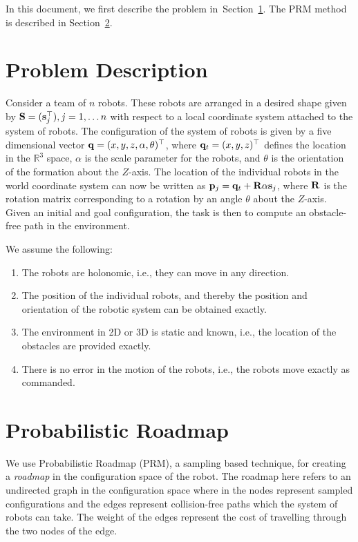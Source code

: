 \documentclass[12pt,a4paper, onecolumn]{IEEEtran}
\newcommand{\vsj}{\mv s_j}
\begin{document}
In this document, we first describe the problem in~Section~\ref{sc:problem}. The PRM
method is described in Section~\ref{sc:prm}. 
\section{Problem Description}

\label{sc:problem}
Consider a team of $n$ robots. These robots are arranged in a desired shape given by $\mv S =(\vsj^\top), j = 1, \ldots n$ with respect to a local coordinate system attached to the system of robots. The configuration of the system of robots is given by a five dimensional vector $\mathbf{q} = (x, y, z, \alpha, \theta)^\top$, where $\mathbf{q}_t = (x, y, z)^\top$ defines the location in the $\mathbb R^3$ space, $\alpha$ is the scale parameter for the robots, and $\theta$ is the orientation of the formation about the $Z$-axis. The location of the individual robots in the world coordinate system can now be written as $\mv p_j = \mv q_t + \mv R \alpha \vsj$, where $\mathbf{R}$ is the rotation matrix corresponding to a rotation by an angle $\theta$ about the $Z$-axis. Given an initial and goal configuration, the task is then to compute an obstacle-free path in the environment.

We assume the following:
\begin{enumerate}
  \item The robots are holonomic, i.e., they can move in any direction.
  \item The position of the individual robots, and thereby the position and orientation of
    the robotic system can be obtained exactly.
  \item The environment in 2D or 3D is static and known, i.e., the location of the obstacles are provided exactly.
  \item There is no error in the motion of the robots, i.e., the robots move exactly as commanded.
\end{enumerate}

\section{Probabilistic Roadmap}
\label{sc:prm}
We use Probabilistic Roadmap (PRM), a sampling based technique, for creating a {\em roadmap} in the configuration space of the robot. 
The roadmap here refers to an undirected graph in the configuration space where in the
nodes represent sampled configurations and the edges represent collision-free paths which the system of robots can take. 
The weight of the edges represent the cost of travelling through the two nodes of the
edge.
\end{document}
